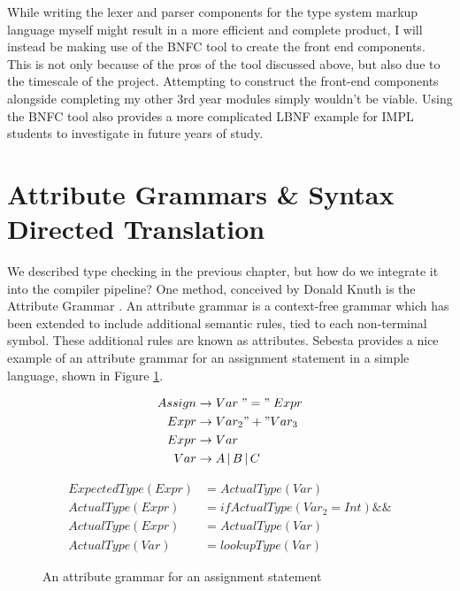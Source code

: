 \documentclass{UoYCSproject}
\begin{document}
While writing the lexer and parser components for the type system markup language
myself might result in a more efficient and complete product, I will instead be
making use of the BNFC tool to create the front end components. This is not only
because of the pros of the tool discussed above, but also due to the timescale
of the project. Attempting to construct the front-end components alongside
completing my other 3rd year modules simply wouldn't be viable. Using the BNFC
tool also provides a more complicated LBNF example for IMPL students to
investigate in future years of study.

\section{Attribute Grammars \& Syntax Directed Translation}
We described type checking in the previous chapter, but how do we
integrate it into the compiler pipeline? One method, conceived by Donald Knuth
is the Attribute Grammar \cite{KnuthGrammars}. An attribute grammar is a
context-free grammar which has been extended to include additional semantic
rules, tied to each non-terminal symbol. These additional rules are known as
attributes. Sebesta provides a nice example of an attribute grammar for an
assignment statement in a simple language, shown in Figure 
\ref{fig:AttributeGrammar}.

\begin{figure}
    \begin{minipage}[b]{.5\textwidth}
        \begin{align*}
            Assign &\rightarrow Var \; "=" \; Expr \\
            Expr &\rightarrow Var_2 "+" Var_3 \\
            Expr &\rightarrow Var \\
            Var &\rightarrow A \, | \, B \, | \, C
        \end{align*}
        \label{fig:ProductionRules}
    \end{minipage}
    \begin{minipage}[b]{.5\textwidth}
        \begin{align*}
                ExpectedType(Expr) &= ActualType(Var) \\
                ActualType(Expr) &= if ActualType(Var_2 = Int) \&\& \\
                ActualType(Expr) &= ActualType(Var) \\
                ActualType(Var) &= lookupType(Var)
        \end{align*}
        \label{fig:AttributeDefinitions}
    \end{minipage}
    \caption{An attribute grammar for an assignment statement}
    \label{fig:AttributeGrammar}
\end{figure}
\end{document}
